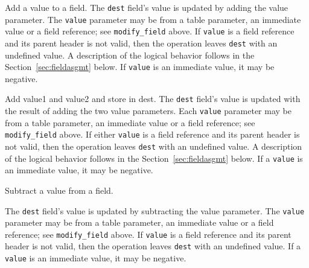 \documentclass[12pt]{article}
\begin{document}

{ %
Add a value to a field.
}
{ %
}
{ %
The \texttt{dest} field's value is updated by adding the value parameter. The \texttt{value} parameter 
may be from a table parameter, an immediate value or a field reference; see \texttt{modify_field} above.  If \texttt{value} is a field reference 
and its parent header is not valid, then the operation leaves \texttt{dest} with an undefined value. A description
of the logical behavior follows in the Section~\ref{sec:fieldasgmt} below.
If \texttt{value} is an immediate value, it may 
be negative.
}


{ %
Add value1 and value2 and store in dest.
}
{ %
}
{ %
The \texttt{dest} field's value is updated with the result of adding
the two value parameters. Each \texttt{value} parameter may be from a
table parameter, an immediate value or a field reference; see \texttt{modify_field} above. If either \texttt{value}
is a field reference and its parent header is not valid, then
the operation leaves \texttt{dest} with an undefined value.  A description of the logical
behavior follows in the Section~\ref{sec:fieldasgmt} below.  If a
\texttt{value} is an immediate value, it may be negative.
}


{ %
Subtract a value from a field.
}
{ %
}
{ %
The \texttt{dest} field's value is updated by subtracting the value parameter. The \texttt{value} parameter 
may be from a table parameter, an immediate value or a field reference; see \texttt{modify_field} above.  
If \texttt{value} is a field reference 
and its parent header is not valid, then the operation leaves \texttt{dest} with an undefined value.
If a \texttt{value} is an immediate value, it may be negative.

}
\end{document}
